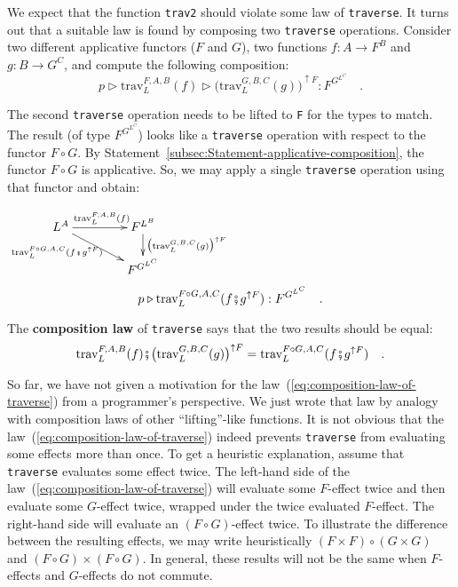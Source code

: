 We expect that the function \lstinline!trav2! should violate some
law of \lstinline!traverse!. It turns out that a suitable law is
found by composing two \lstinline!traverse! operations. Consider
two different applicative functors ($F$ and $G$), two functions
$f:A\rightarrow F^{B}$ and $g:B\rightarrow G^{C}$, and compute the
following composition:
\[
p\triangleright\text{trav}_{L}^{F,A,B}(f)\triangleright\big(\text{trav}_{L}^{G,B,C}(g)\big)^{\uparrow F}:F^{G^{L^{C}}}\quad.
\]

\noindent The second \lstinline!traverse! operation needs to be lifted
to \lstinline!F! for the types to match. The result (of type $F^{G^{L^{C}}}$)
looks like a \lstinline!traverse! operation with respect to the functor
$F\circ G$. By Statement~\ref{subsec:Statement-applicative-composition},
the functor $F\circ G$ is applicative. So, we may apply a single
\lstinline!traverse! operation using that functor and obtain:
\noindent \begin{center}
$\xymatrix{\xyScaleY{1.5pc}\xyScaleX{3.4pc}L^{A}\ar[dr]\sb(0.35){\text{trav}_{L}^{F\circ G,A,C}(f\bef g^{\uparrow F})~~}\ar[r]\sp(0.5){\text{trav}_{L}^{F,A,B}(f)} & F^{L^{B}}\ar[d]\sp(0.4){\big(\text{trav}_{L}^{G,B,C}(g)\big)^{\uparrow F}}\\
 & F^{G^{L^{C}}}
}
$
\[
p\triangleright\text{trav}_{L}^{F\circ G,A,C}(f\bef g^{\uparrow F}):F^{G^{L^{C}}}\quad.
\]
\par\end{center}

\noindent The \textbf{composition law}
of \lstinline!traverse! says that the two results should be equal:
\begin{equation}
\text{trav}_{L}^{F,A,B}(f)\bef\big(\text{trav}_{L}^{G,B,C}(g)\big)^{\uparrow F}=\text{trav}_{L}^{F\circ G,A,C}(f\bef g^{\uparrow F})\quad.\label{eq:composition-law-of-traverse}
\end{equation}

So far, we have not given a motivation for the law~(\ref{eq:composition-law-of-traverse})
from a programmer\textsf{'}s perspective. We just wrote that law by analogy
with composition laws of other \textsf{``}lifting\textsf{''}-like functions. It is
not obvious that the law~(\ref{eq:composition-law-of-traverse})
indeed prevents \lstinline!traverse! from evaluating some effects
more than once. To get a heuristic explanation, assume that \lstinline!traverse!
evaluates some effect twice. The left-hand side of the law~(\ref{eq:composition-law-of-traverse})
will evaluate some $F$-effect twice and then evaluate some $G$-effect
twice, wrapped under the twice evaluated $F$-effect. The right-hand
side will evaluate an $(F\circ G)$-effect twice. To illustrate the
difference between the resulting effects, we may write heuristically
$(F\times F)\circ(G\times G)$ and $(F\circ G)\times(F\circ G)$.
In general, these results will not be the same when $F$-effects and
$G$-effects do not commute.

